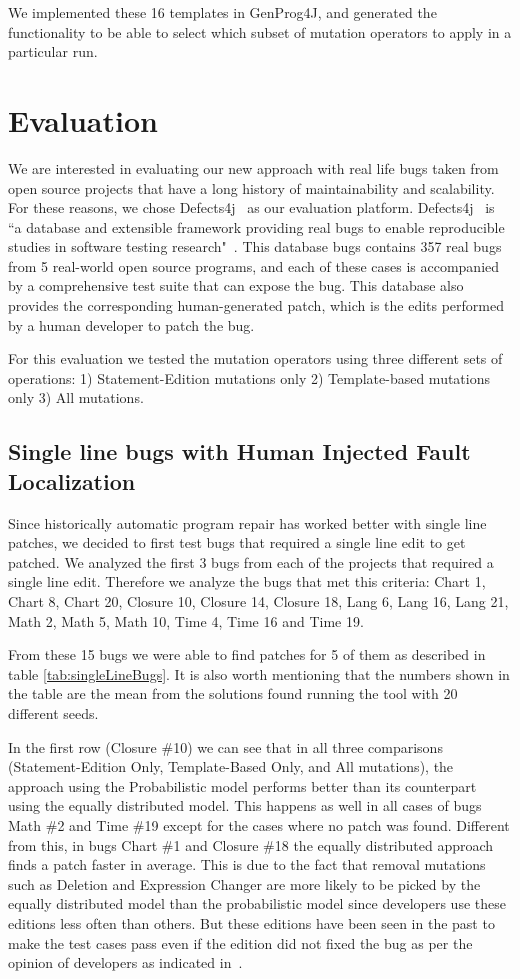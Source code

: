 \documentclass[conference]{IEEEtran}
\begin{document}
We implemented these 16 templates in GenProg4J, and generated the functionality 
to be able to select which subset of mutation operators to apply in a particular 
run.

\section{Evaluation}
We are interested in evaluating our new approach with real life bugs taken from 
open source projects that have a long history of maintainability and 
scalability. For these reasons, we chose Defects4j~\cite{just14} as our 
evaluation platform. Defects4j~\cite{just14} is ``a database and extensible 
framework providing real bugs to enable reproducible studies in software testing 
research"~\cite{just14}. This database bugs contains 357 real bugs from 5 
real-world open source programs, and each of these cases is accompanied by a 
comprehensive test suite that can expose the bug. This database also provides 
the corresponding human-generated patch, which is the edits performed by a human 
developer to patch the bug.

For this evaluation we tested the mutation operators using three different sets 
of operations: 1) Statement-Edition mutations only 2) Template-based mutations 
only 3) All mutations.


\subsection{Single line bugs with Human Injected Fault Localization}
Since historically automatic program repair has worked better with single line 
patches, we decided to first test bugs that required a single line edit to get 
patched. We analyzed the first 3 bugs from each of the projects that required a 
single line edit. Therefore we analyze the bugs that met this criteria: Chart 1, 
Chart 8, Chart 20, Closure 10, Closure 14, Closure 18, Lang 6, Lang 16, Lang 21, 
Math 2, Math 5, Math 10, Time 4, Time 16 and Time 19.

From these 15 bugs we were able to find patches for 5 of them as described in table \ref{tab:singleLineBugs}. It is also worth mentioning that the numbers shown in the table are the mean from the solutions found running the tool with 20 different seeds. 

In the first row (Closure \#10) we can see that in all three comparisons (Statement-Edition Only, Template-Based Only, and All mutations), the approach using the Probabilistic model performs better than its counterpart using the equally distributed model. This happens as well in all cases of bugs Math \#2 and Time \#19 except for the cases where no patch was found. Different from this, in bugs Chart \#1 and Closure \#18 the equally distributed approach finds a patch faster in average. This is due to the fact that removal mutations such as Deletion and Expression Changer are more likely to be picked by the equally distributed model than the probabilistic model since developers use these editions less often than others. But these editions have been seen in the past to make the test cases pass even if the edition did not fixed the bug as per the opinion of developers as indicated in~\cite{kim2013}.
\end{document}
